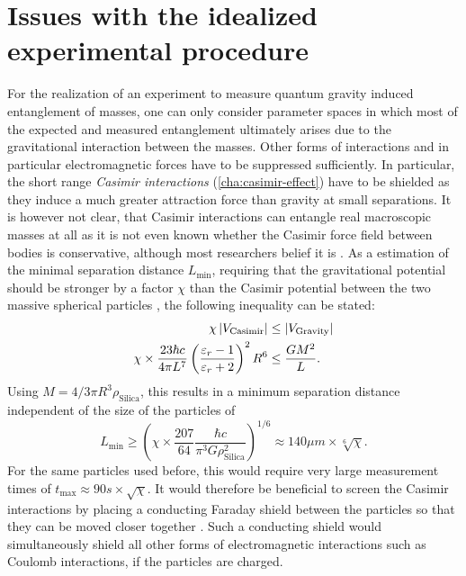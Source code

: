 \section{Issues with the idealized experimental procedure}\label{sec:2:experimental-problems}

For the realization of an experiment to measure quantum gravity induced entanglement of masses, one can only consider parameter spaces in which most of the expected and measured entanglement ultimately arises due to the gravitational interaction between the masses.
Other forms of interactions and in particular electromagnetic forces have to be suppressed sufficiently.
In particular, the short range \emph{Casimir interactions} (\cref{cha:casimir-effect}) have to be shielded as they induce a much greater attraction force than gravity at small separations.
It is however not clear, that Casimir interactions can entangle real macroscopic masses at all as it is not even known whether the Casimir force field between bodies is conservative, although most researchers belief it is \cite{DeBiase_2012,Yi_2023}.
As a estimation of the minimal separation distance $L_\mathrm{min}$, requiring that the gravitational potential should be stronger by a factor $\chi$ than the Casimir potential between the two massive spherical particles \cite{Emig_2007}, the following inequality can be stated:
\begin{align}
  \chi \left\lvert V_\mathrm{Casimir}\right\rvert &\leq \left\lvert V_\mathrm{Gravity}\right\rvert \\
  \chi \times \frac{23 \hbar c}{4 \pi L^7} \left(\frac{\varepsilon_r - 1}{\varepsilon_r + 2}\right)^2 R^6 &\leq  \frac{G M^2}{L}.
\end{align}
Using $M = 4/3 \pi R^3\rho_\mathrm{Silica}$, this results in a minimum separation distance independent of the size of the particles of
\begin{equation}
  L_\mathrm{min} \geq \left(\chi \times \frac{207}{64} \frac{\hbar c}{\pi^3 G \rho_\mathrm{Silica}^2}\right)^{1/6} \approx 140\si{\mu m} \times \sqrt[6]{\chi} .
\end{equation}
For the same particles used before, this would require very large measurement times of $t_\mathrm{max} \approx 90\si{s} \times \sqrt{\chi}$.
It would therefore be beneficial to screen the Casimir interactions by placing a conducting Faraday shield between the particles so that they can be moved closer together \cite{Kamp_2020}.
Such a conducting shield would simultaneously shield all other forms of electromagnetic interactions such as Coulomb interactions, if the particles are charged.

